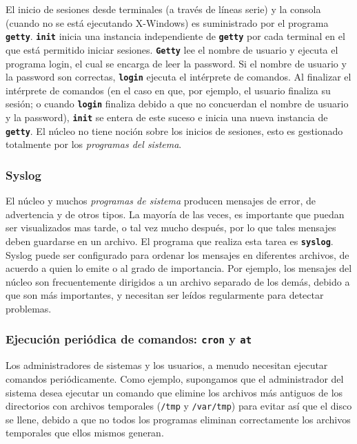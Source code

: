 \documentclass[12pt]{article}
\begin{document}
 El inicio de sesiones desde terminales (a través de líneas serie) y la
consola (cuando no se está ejecutando X-Windows) es suministrado por el programa
\texttt{\textbf{getty}}. \texttt{\textbf{init}} inicia una instancia
independiente de \texttt{\textbf{getty}} por cada terminal en el que está permitido iniciar
sesiones. \texttt{\textbf{Getty}} lee el nombre de usuario y ejecuta el
programa login, el cual se encarga de leer la password. Si el nombre de usuario
y la password son correctas, \texttt{\textbf{login}} ejecuta el intérprete de
comandos.  Al finalizar el intérprete de comandos (en el caso en que, por
ejemplo, el usuario finaliza su sesión; o cuando \texttt{\textbf{login}} finaliza debido a que no
concuerdan el nombre de usuario y la password), \texttt{\textbf{init}} se
entera de este suceso e inicia una nueva instancia de \texttt{\textbf{getty}}.
El núcleo no tiene noción sobre los inicios de sesiones, esto es gestionado
totalmente por los \textit{programas del sistema}.  


\subsubsection{Syslog}

 El núcleo y muchos \textit{programas de sistema} producen
mensajes de error, de advertencia y de otros tipos. La mayoría de las veces, es
importante que puedan ser visualizados mas tarde, o tal vez mucho después, por
lo que tales mensajes deben guardarse en un archivo. El programa que realiza
esta tarea es \texttt{\textbf{syslog}}. Syslog puede ser configurado para
ordenar los mensajes en diferentes archivos, de acuerdo a quien lo emite o al
grado de importancia.  Por ejemplo, los mensajes del núcleo son frecuentemente
dirigidos a un archivo separado de los demás, debido a que son más importantes,
y necesitan ser leídos regularmente para detectar problemas.  

\subsubsection{Ejecución periódica de comandos: \texttt{\textbf{cron}} y
\texttt{\textbf{at}}}

 Los administradores de sistemas y los usuarios, a menudo necesitan
ejecutar comandos periódicamente. Como ejemplo, supongamos que el administrador
del sistema desea ejecutar un comando que elimine los archivos más antiguos de
los directorios con archivos temporales (\texttt{/tmp} y
\texttt{/var/tmp}) para evitar así que el disco se llene, debido a
que no todos los programas eliminan correctamente los archivos temporales que
ellos mismos generan.  
\end{document}
